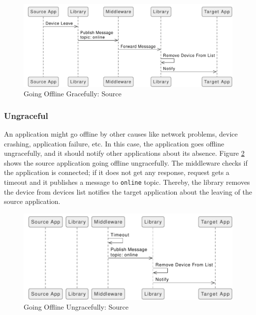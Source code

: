 \FloatBarrier \begin{figure}[H]
    \includegraphics[width=\linewidth]{../figures/Going-Offline-Graceful-Source.pdf}
    \centering
    \caption{Going Offline Gracefully: Source}
    \label{fig:Going-Offline-Graceful-Source}
\end{figure} \FloatBarrier

\subsubsection{Ungraceful}
An application might go offline by other causes like network problems, device crashing, application failure, etc. In this case, the application goes offline ungracefully, and it should notify other applications about its absence. Figure \ref{fig:Going-Offline-Ungraceful-Source} shows the source application going offline ungracefully. The middleware checks if the application is connected; if it does not get any response, request gets a timeout and it publishes a message to  \lstinline[basicstyle=\ttfamily]{online} topic. Thereby, the library removes the device from devices list notifies the target application about the leaving of the source application.

\FloatBarrier \begin{figure}[H]
    \includegraphics[width=\linewidth]{../figures/Going-Offline-Ungraceful-Source.pdf}
    \centering
    \caption{Going Offline Ungracefully: Source}
    \label{fig:Going-Offline-Ungraceful-Source}
\end{figure} \FloatBarrier

